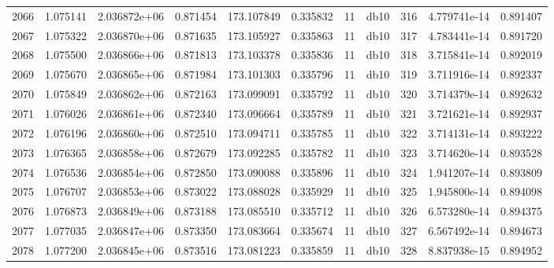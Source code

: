 \begin{tabular}{lrrrrrrlrrr}
2066 &    1.075141 &        2.036872e+06 &  0.871454 &              173.107849 &    0.335832 &      11 &         db10 &    316 &   4.779741e-14 &      0.891407 \\
2067 &    1.075322 &        2.036870e+06 &  0.871635 &              173.105927 &    0.335863 &      11 &         db10 &    317 &   4.783441e-14 &      0.891720 \\
2068 &    1.075500 &        2.036866e+06 &  0.871813 &              173.103378 &    0.335836 &      11 &         db10 &    318 &   3.715841e-14 &      0.892019 \\
2069 &    1.075670 &        2.036865e+06 &  0.871984 &              173.101303 &    0.335796 &      11 &         db10 &    319 &   3.711916e-14 &      0.892337 \\
2070 &    1.075849 &        2.036862e+06 &  0.872163 &              173.099091 &    0.335792 &      11 &         db10 &    320 &   3.714379e-14 &      0.892632 \\
2071 &    1.076026 &        2.036861e+06 &  0.872340 &              173.096664 &    0.335789 &      11 &         db10 &    321 &   3.721621e-14 &      0.892937 \\
2072 &    1.076196 &        2.036860e+06 &  0.872510 &              173.094711 &    0.335785 &      11 &         db10 &    322 &   3.714131e-14 &      0.893222 \\
2073 &    1.076365 &        2.036858e+06 &  0.872679 &              173.092285 &    0.335782 &      11 &         db10 &    323 &   3.714620e-14 &      0.893528 \\
2074 &    1.076536 &        2.036854e+06 &  0.872850 &              173.090088 &    0.335896 &      11 &         db10 &    324 &   1.941207e-14 &      0.893809 \\
2075 &    1.076707 &        2.036853e+06 &  0.873022 &              173.088028 &    0.335929 &      11 &         db10 &    325 &   1.945800e-14 &      0.894098 \\
2076 &    1.076873 &        2.036849e+06 &  0.873188 &              173.085510 &    0.335712 &      11 &         db10 &    326 &   6.573280e-14 &      0.894375 \\
2077 &    1.077035 &        2.036847e+06 &  0.873350 &              173.083664 &    0.335674 &      11 &         db10 &    327 &   6.567492e-14 &      0.894673 \\
2078 &    1.077200 &        2.036845e+06 &  0.873516 &              173.081223 &    0.335859 &      11 &         db10 &    328 &   8.837938e-15 &      0.894952 \\

\end{tabular}

